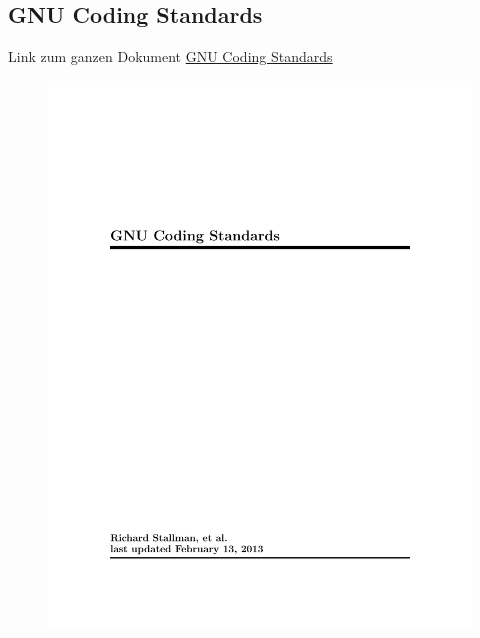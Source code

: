 \documentclass[a4paper,
               10pt,
               fleqn]{article}
\begin{document}
\begin{appendix}
    \section{GNU Coding Standards}
    Link zum ganzen Dokument
    \href{http://www.gnu.org/prep/standards/}{GNU Coding Standards}
    \begin{figure}[h!]
    \includegraphics[page=5, width=1\textwidth]{gnustandard.pdf}
    \end{figure}
\end{appendix}
\end{document}
